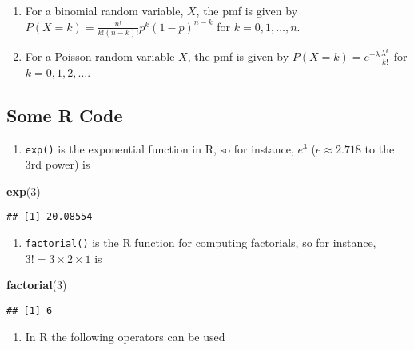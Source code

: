 \documentclass[]{article}
\newenvironment{Shaded}{\begin{snugshade}}{\end{snugshade}}
\newcommand{\DecValTok}[1]{\textcolor[rgb]{0.00,0.00,0.81}{#1}}
\newcommand{\KeywordTok}[1]{\textcolor[rgb]{0.13,0.29,0.53}{\textbf{#1}}}
\newcommand{\NormalTok}[1]{#1}
\providecommand{\tightlist}{%
  \setlength{\itemsep}{0pt}\setlength{\parskip}{0pt}}
\begin{document}
\begin{enumerate}
\def\labelenumi{\arabic{enumi}.}
\item
  For a binomial random variable, \(X\), the pmf is given by
  \(P(X = k) = \frac{n!}{k!(n-k)!}p^{k}(1-p)^{n-k}\) for
  \(k=0,1,\ldots,n\).
\item
  For a Poisson random variable \(X\), the pmf is given by
  \(P(X = k) = e^{-\lambda}\frac{\lambda^{k}}{k!}\) for
  \(k=0,1,2,\ldots\).
\end{enumerate}

\hypertarget{some-r-code}{%
\subsection{Some R Code}\label{some-r-code}}

\begin{enumerate}
\def\labelenumi{\arabic{enumi}.}
\tightlist
\item
  \texttt{exp()} is the exponential function in R, so for instance,
  \(e^3\) (\(e\approx2.718\) to the 3rd power) is
\end{enumerate}

\begin{Shaded}
\begin{Highlighting}[]
\KeywordTok{exp}\NormalTok{(}\DecValTok{3}\NormalTok{)}
\end{Highlighting}
\end{Shaded}

\begin{verbatim}
## [1] 20.08554
\end{verbatim}

\begin{enumerate}
\def\labelenumi{\arabic{enumi}.}
\setcounter{enumi}{1}
\tightlist
\item
  \texttt{factorial()} is the R function for computing factorials, so
  for instance, \(3!=3\times2\times1\) is
\end{enumerate}

\begin{Shaded}
\begin{Highlighting}[]
\KeywordTok{factorial}\NormalTok{(}\DecValTok{3}\NormalTok{)}
\end{Highlighting}
\end{Shaded}

\begin{verbatim}
## [1] 6
\end{verbatim}

\begin{enumerate}
\def\labelenumi{\arabic{enumi}.}
\setcounter{enumi}{2}
\tightlist
\item
  In R the following operators can be used
\end{enumerate}
\end{document}
